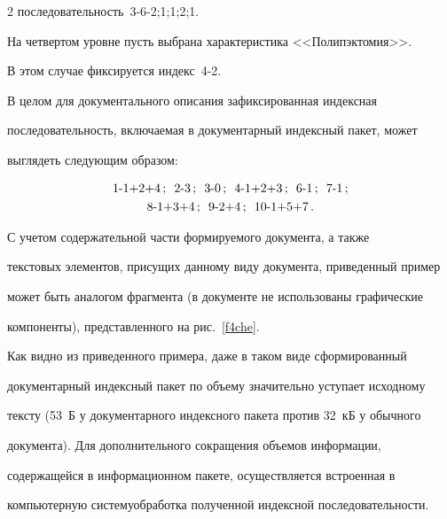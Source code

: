 \begin{multicols}{2}
последовательность~3-6-2;1;1;2;1.


     


     На четвертом уровне пусть выбрана характеристика <<Полипэктомия>>. 


В этом случае фиксируется индекс~4-2.


     


     В целом для документального описания зафиксированная индексная 


последовательность, включаемая в документарный индексный пакет, может 


выглядеть следующим образом:


     \begin{gather*}


     \mbox{1-1+2+4}\,;\enskip \mbox{2-3}\,;\enskip \mbox{3-0}\,;\enskip \mbox{4-1+2+3}\,;\enskip


     \mbox{6-1}\,;\enskip \mbox{7-1}\,;\\


\mbox{8-1+3+4}\,;\enskip \mbox{9-2+4}\,;\enskip \mbox{10-1+5+7}\,.


      \end{gather*}


     


     С учетом содержательной части формируемого документа, а также 


текстовых элементов, присущих данному виду документа, приведенный пример 


может быть аналогом фрагмента (в документе не использованы графические 


компоненты), представленного на рис.~\ref{f4che}.





     


     Как видно из приведенного примера, даже в таком виде сформированный 


документарный индексный пакет по объему значительно уступает исходному 


тексту (53~Б у документарного индексного пакета против 32~кБ у обычного 


документа). Для дополнительного сокращения объемов информации, 


содержащейся в информационном пакете, осуществляется встроенная в 


компьютерную систему\linebreak обработка полученной индексной по\-сле\-до\-ва\-тель\-ности. 



\end{multicols}
